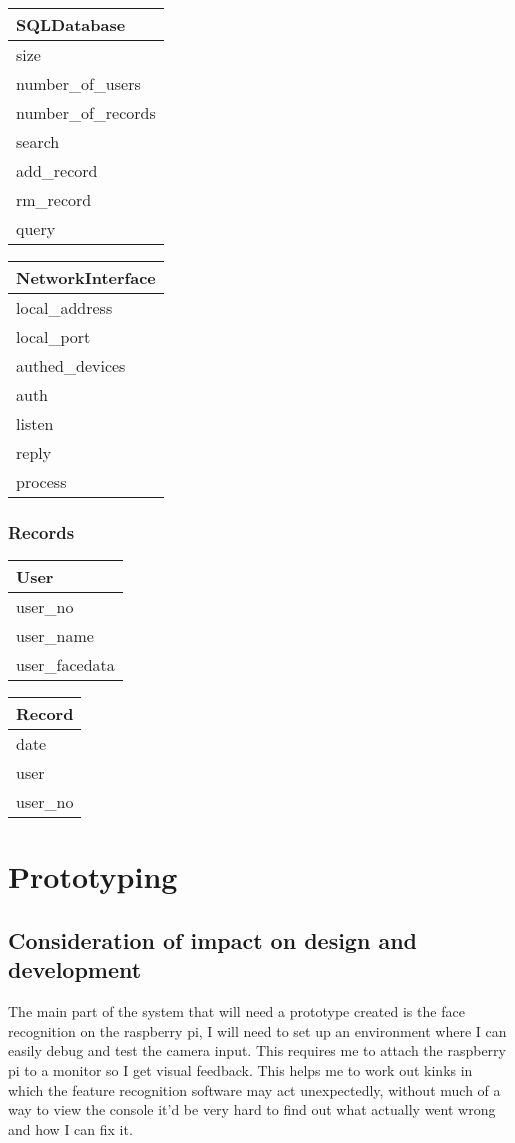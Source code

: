 \documentclass[12pt,a4paper]{report}
\begin{document}
\begin{tabular}{|l|}
\hline
\textbf{SQLDatabase}\\\hline
size\\
number\_of\_users\\
number\_of\_records\\\hline
search\\
add\_record\\
rm\_record\\
query\\\hline
\end{tabular}
\begin{tabular}{|l|}
\hline
\textbf{NetworkInterface}\\\hline
local\_address\\
local\_port\\
authed\_devices\\\hline
auth\\
listen\\
reply\\
process\\\hline
\end{tabular}

\subsubsection[Records]{Records}

\begin{tabular}{|l|}
\hline
\textbf{User}\\\hline
user\_no\\
user\_name\\
user\_facedata\\\hline
\end{tabular}
\begin{tabular}{|l|}
\hline
\textbf{Record}\\\hline
date\\
user\\
user\_no\\\hline
\end{tabular}



\section[Prototyping]{Prototyping}
\subsection[Consideration of impact on design and development]{Consideration of impact on design and development}
The main part of the system that will need a prototype created is the face recognition on the raspberry pi, I will need to set up an environment where I can easily debug and test the camera input. This requires me to attach the raspberry pi to a monitor so I get visual feedback. This helps me to work out kinks in which the feature recognition software may act unexpectedly, without much of a way to view the console it’d be very hard to find out what actually went wrong and how I can fix it.
\end{document}
